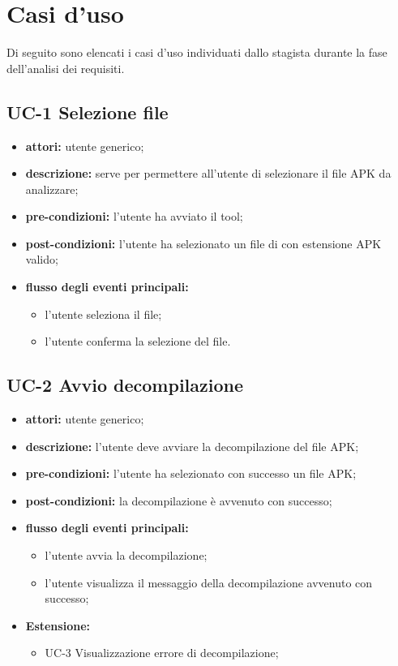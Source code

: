 \section{Casi d'uso}\label{sec:casi-d'uso}
Di seguito sono elencati i casi d'uso individuati dallo stagista durante la fase dell'analisi dei requisiti.
\subsection*{UC-1 Selezione file}\label{subsec:uc-1-selezione-file}
\begin{itemize}
    \item \textbf{attori:} utente generico;
    \item \textbf{descrizione:} serve per permettere all'utente di selezionare il file APK da analizzare;
    \item \textbf{pre-condizioni:} l'utente ha avviato il tool;
    \item \textbf{post-condizioni:} l'utente ha selezionato un file di con estensione APK valido;
    \item \textbf{flusso degli eventi principali:}
    \begin{itemize}
        \item l'utente seleziona il file;
        \item l'utente conferma la selezione del file.
    \end{itemize}
\end{itemize}
\subsection*{UC-2 Avvio decompilazione}\label{subsec:uc-2-avvio-decompilazione}
\begin{itemize}
    \item \textbf{attori:} utente generico;
    \item \textbf{descrizione:} l'utente deve avviare la decompilazione del file APK;
    \item \textbf{pre-condizioni:} l'utente ha selezionato con successo un file APK;
    \item \textbf{post-condizioni:} la decompilazione è avvenuto con successo;
    \item \textbf{flusso degli eventi principali:}
    \begin{itemize}
        \item l'utente avvia la decompilazione;
        \item l'utente visualizza il messaggio della decompilazione avvenuto con successo;
    \end{itemize}
    \item \textbf{Estensione:}
    \begin{itemize}
        \item UC-3 Visualizzazione errore di decompilazione;
    \end{itemize}
\end{itemize}

